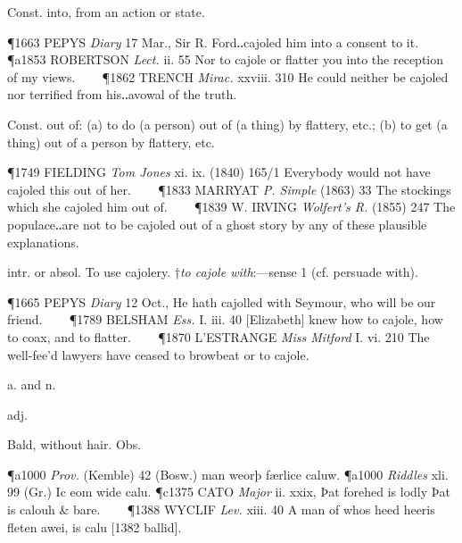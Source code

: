 \begin{description}[wide, labelwidth=!, labelindent=0pt]
\begin{myenumerate}
 Const. into, from an action or state.

\P 1663 PEPYS  \textit{Diary} 17 Mar., Sir R. Ford‥cajoled him into a consent to it.
\P a1853 ROBERTSON  \textit{Lect.} ii. 55 Nor to cajole or flatter you into the reception of my views.    
\P 1862 TRENCH  \textit{Mirac.} xxviii. 310 He could neither be cajoled nor terrified from his‥avowal of the truth.

 Const. out of: (a) to do (a person) out of (a thing) by flattery, etc.; (b) to get (a thing) out of a person by flattery, etc.

\P 1749 FIELDING  \textit{Tom Jones} xi. ix. (1840) 165/1 Everybody would not have cajoled this out of her.    
\P 1833 MARRYAT  \textit{P. Simple} (1863) 33 The stockings which she cajoled him out of.    
\P 1839 W. IRVING  \textit{Wolfert's R.} (1855) 247 The populace‥are not to be cajoled out of a ghost story by any of these plausible explanations.

 intr. or absol. To use cajolery. †\textit{to cajole with}:—sense 1 (cf. persuade with).

\P 1665 PEPYS  \textit{Diary} 12 Oct., He hath cajolled with Seymour, who will be our friend.    
\P 1789 BELSHAM  \textit{Ess.} I. iii. 40 [Elizabeth] knew how to cajole, how to coax, and to flatter.    
\P 1870 L'ESTRANGE  \textit{Miss Mitford} I. vi. 210 The well-fee'd lawyers have ceased to browbeat or to cajole.
\end{myenumerate}


 a. and n.

\noindent {}

\vspace{-0.3cm}

\begin{myenumerate}

 adj.

 Bald, without hair. Obs.

\P a1000 \textit{Prov.}  (Kemble) 42 (Bosw.)  man weorþ færlice caluw.
\P a1000 \textit{Riddles}  xli. 99 (Gr.) Ic eom wide calu.
\P c1375 CATO  \textit{Major} ii. xxix, Þat forehed is lodly Þat is calouh \& bare.    
\P 1388 WYCLIF  \textit{Lev.} xiii. 40 A man of whos heed heeris fleten awei, is calu [1382 ballid].


\end{myenumerate}
\end{description}
